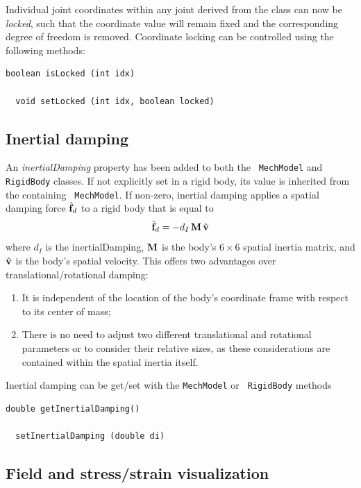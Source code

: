\documentclass{article}
\begin{document}
Individual joint coordinates within any joint derived from the
 class can now be {\it
locked}, such that the coordinate value will remain fixed and the
corresponding degree of freedom is removed. Coordinate locking can be
controlled using the following methods:

\begin{lstlisting}[]
  boolean isLocked (int idx)

  void setLocked (int idx, boolean locked)
\end{lstlisting}

\subsection*{Inertial damping}	

An {\it inertialDamping} property has been added to both the {\tt
MechModel} and {\tt RigidBody} classes. If not explicitly set in a
rigid body, its value is inherited from the containing {\tt
MechModel}. If non-zero, inertial damping applies a spatial damping
force $\hat{{\bf f}}_d$ to a rigid body that is equal to
%
\begin{equation}
\hat{{\bf f}}_d = -d_I \, {\bf M} \, \hat{{\bf v}}
\end{equation}
%
where $d_I$ is the {\sf inertialDamping}, ${\bf M}$ is the body's $6 \times
6$ spatial inertia matrix, and $\hat{{\bf v}}$ is the body's spatial
velocity. This offers two advantages over translational/rotational damping:

\begin{enumerate}

\item It is independent of the location of the body's coordinate
frame with respect to its center of mass;

\item 
There is no need to adjust two different translational and rotational
parameters or to consider their relative sizes, as these
considerations are contained within the spatial inertia itself.

\end{enumerate}

Inertial damping can be get/set with the {\tt MechModel} or {\tt
RigidBody} methods
%
\begin{lstlisting}[]
  double getInertialDamping()

  setInertialDamping (double di)
\end{lstlisting}
%

\subsection*{Field and stress/strain visualization}
\end{document}
